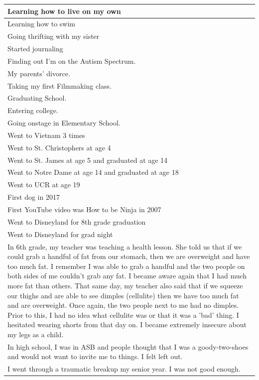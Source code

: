 \documentclass[
  .7em,
  letterpaper,
  DIV=11,
  numbers=noendperiod]{scrartcl}
\begin{document}
\begin{table}
\begin{tabular}{l}
\hline
Learning how to live on my own\\
\hline
Learning how to swim\\
\hline
Going thrifting with my sister\\
\hline
Started journaling\\
\hline
Finding out I'm on the Autism Spectrum.\\
\hline
My parents' divorce.\\
\hline
Taking my first Filmmaking class.\\
\hline
Graduating School.\\
\hline
Entering college.\\
\hline
Going onstage in Elementary School.\\
\hline
Went to Vietnam 3 times\\
\hline
Went to St. Christophers at age 4\\
\hline
Went to St. James at age 5 and graduated at age 14\\
\hline
Went to Notre Dame at age 14 and graduated at age 18\\
\hline
Went to UCR at age 19\\
\hline
First dog in 2017\\
\hline
First YouTube video was How to be Ninja in 2007\\
\hline
Went to Disneyland for 8th grade graduation\\
\hline
Went to Disneyland for grad night\\
\hline
In 6th grade, my teacher was teaching a health lesson. She told us that if we could grab a handful of fat from our stomach, then we are overweight and have too much fat. I remember I was able to grab a handful and the two people on both sides of me couldn't grab any fat. I became aware again that I had much more fat than others. That same day, my teacher also said that if we squeeze our thighs and are able to see dimples (cellulite) then we have too much fat and are overweight. Once again, the two people next to me had no dimples. Prior to this, I had no idea what cellulite was or that it was a 'bad' thing. I hesitated wearing shorts from that day on. I became extremely insecure about my legs as a child.\\
\hline
In high school, I was in ASB and people thought that I was a goody-two-shoes and would not want to invite me to things. I felt left out.\\
\hline
I went through a traumatic breakup my senior year. I was not good enough.\\

\end{tabular}
\end{table}
\end{document}
